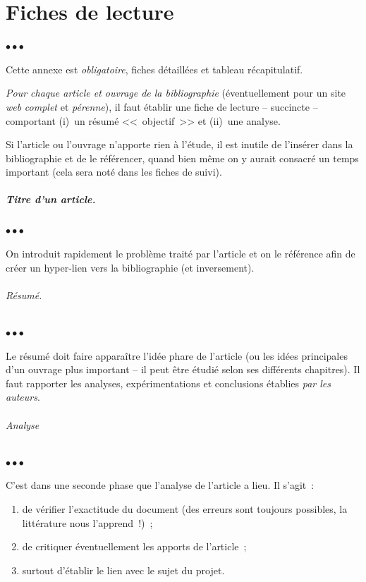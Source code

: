 \documentclass[11pt, french, screen, research-development]{report-rd-info}
\newenvironment{explanation}
{\color{blue}
 \begin{list}{}{\hspace{0.2\textwidth}\color{blue}}\item $\bullet\bullet\bullet$
}
{\end{list}}
\begin{document}
\chapter{Fiches de lecture}
\label{ann:FichesLecture}

\begin{explanation}
   Cette annexe est \emph{obligatoire}, fiches détaillées et tableau récapitulatif.

   \emph{Pour chaque article et ouvrage de la bibliographie} (éventuellement pour un site \emph{web} \emph{complet} et \emph{pérenne}), il faut établir une fiche de lecture -- succincte -- comportant (i)~un résumé <<~objectif~>> et (ii)~une analyse.

   Si l'article ou l'ouvrage n'apporte rien à l'étude, il est inutile de l'insérer dans la bibliographie et de le référencer, quand bien même on y aurait consacré un temps important (cela sera noté dans les fiches de suivi).
\end{explanation}

\paragraph{\emph{Titre d'un article}.}

\begin{explanation}
   On introduit rapidement le problème traité par l'article et on le référence afin de créer un hyper-lien vers la bibliographie \cite{Pascal-1671} (et inversement).
\end{explanation}

\subparagraph{Résumé.}

\begin{explanation}
   Le résumé doit faire apparaître l'idée phare de l'article (ou les idées principales d'un ouvrage plus important -- il peut être étudié selon ses différents chapitres).
   Il faut rapporter les analyses, expérimentations et conclusions établies \emph{par les auteurs}.
\end{explanation}

\subparagraph{Analyse}

\begin{explanation}
   C'est dans une seconde phase que l'analyse de l'article a lieu.
   Il s'agit~:
   \begin{enumerate}
      \item de vérifier l'exactitude du document (des erreurs sont toujours possibles, la littérature nous l'apprend~!)~;
      \item de critiquer éventuellement les apports de l'article~;
      \item surtout d'établir le lien avec le sujet du projet.
   \end{enumerate}
\end{explanation}
\end{document}
